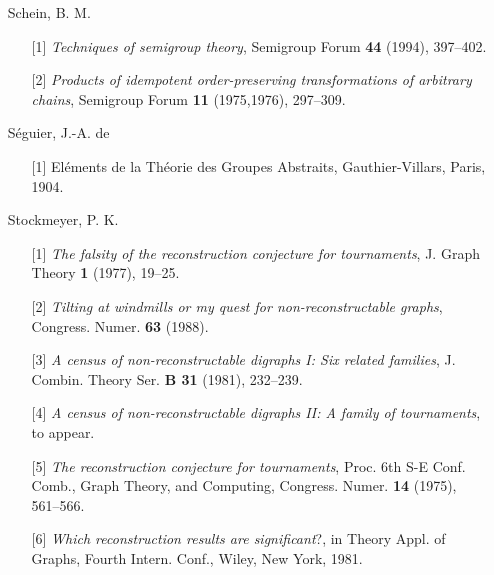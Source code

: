 \documentclass{surv-l}
\numberwithin{equation}{section}
\numberwithin{table}{section}
\numberwithin{figure}{section}
\theoremstyle{definition}
\begin{document}
\begin{enumerate}
\item[] Schein, B. M.
\begin{enumerate}
\item[\hypertarget{bib69}{[1]}] \emph{Techniques of semigroup theory}, Semigroup Forum \textbf{44}
(1994), 397--402.

\item[\hypertarget{bib69a}{[2]}] \emph{Products of idempotent order-preserving
transformations of arbitrary chains}, Semigroup Forum
\textbf{11} (1975,1976), 297--309.
\end{enumerate}

\item[] S\'{e}guier, J.-A. de
\begin{enumerate}
\item[\hypertarget{bib70}{[1]}] El\'{e}ments de la Th\'{e}orie des Groupes Abstraits,
Gauthier-Villars, Paris, 1904.
\end{enumerate}

\item[] Stockmeyer, P. K.
\begin{enumerate}
\item[\hypertarget{bib71}{[1]}] \emph{The falsity of the reconstruction conjecture for
tournaments}, J. Graph Theory \textbf{1} (1977), 19--25.

\item[\hypertarget{bib71a}{[2]}] \emph{Tilting at windmills or my quest for
non-reconstructable graphs}, Congress. Numer. \textbf{63}
(1988).

\item[\hypertarget{bib71b}{[3]}] \emph{A census of non-reconstructable digraphs I:
Six related families}, J. Combin. Theory Ser. \textbf{B
31} (1981), 232--239.

\item[\hypertarget{bib71c}{[4]}] \emph{A census of non-reconstructable digraphs II: A
family of tournaments}, to appear.

\item[\hypertarget{bib71d}{[5]}] \emph{The reconstruction conjecture for tournaments},
Proc. 6th S-E Conf. Comb., Graph Theory, and Computing,
Congress. Numer. \textbf{14} (1975), 561--566.

\item[\hypertarget{bib71e}{[6]}] \emph{Which reconstruction results are significant}?, in
Theory Appl. of Graphs, Fourth Intern. Conf., Wiley, New
York, 1981.
\end{enumerate}


\end{enumerate}
\end{document}
